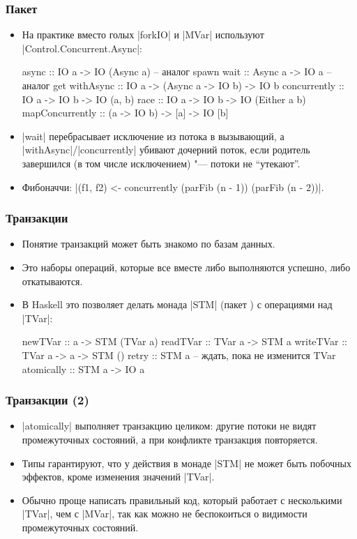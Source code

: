 \documentclass[11pt]{beamer}
\begin{document}
\begin{frame}[fragile]
  \frametitle{Пакет }
  \begin{itemize}
    \item На практике вместо голых \haskinline|forkIO| и \haskinline|MVar| используют \haskinline|Control.Concurrent.Async|:
          \begin{haskellsmall}
            async :: IO a -> IO (Async a)   -- аналог spawn
            wait  :: Async a -> IO a        -- аналог get
            withAsync :: IO a -> (Async a -> IO b) -> IO b
            concurrently :: IO a -> IO b -> IO (a, b)
            race :: IO a -> IO b -> IO (Either a b)
            mapConcurrently :: (a -> IO b) -> [a] -> IO [b]
          \end{haskellsmall}
    \item \haskinline|wait| перебрасывает исключение из потока в вызывающий, а \haskinline|withAsync|/\haskinline|concurrently| убивают дочерний поток, если родитель завершился (в том числе исключением) "--- потоки не \enquote{утекают}.
    \item Фибоначчи: \haskinline|(f1, f2) <- concurrently (parFib (n - 1)) (parFib (n - 2))|.
  \end{itemize}
\end{frame}

\begin{frame}[fragile]
  \frametitle{Транзакции}
  \begin{itemize}
    \item Понятие транзакций может быть знакомо по базам данных.
    \item Это наборы операций, которые все вместе либо выполняются успешно, либо откатываются.
    \item В Haskell это позволяет делать монада \haskinline|STM| (пакет ) с операциями над \haskinline|TVar|:
          \begin{haskellsmall}
            newTVar :: a -> STM (TVar a)
            readTVar :: TVar a -> STM a
            writeTVar :: TVar a -> a -> STM ()
            retry :: STM a   -- ждать, пока не изменится TVar
            atomically :: STM a -> IO a
          \end{haskellsmall}
  \end{itemize}
\end{frame}

\begin{frame}[fragile]
  \frametitle{Транзакции (2)}
  \begin{itemize}
    \item \haskinline|atomically| выполняет транзакцию целиком: другие потоки не видят промежуточных состояний, а при конфликте транзакция повторяется.
    \item Типы гарантируют, что у действия в монаде \haskinline|STM| не может быть побочных эффектов, кроме изменения значений \haskinline|TVar|.
    \item Обычно проще написать правильный код, который работает с несколькими \haskinline|TVar|, чем с \haskinline|MVar|, так как можно не беспокоиться о видимости промежуточных состояний.
  \end{itemize}
\end{frame}
\end{document}
